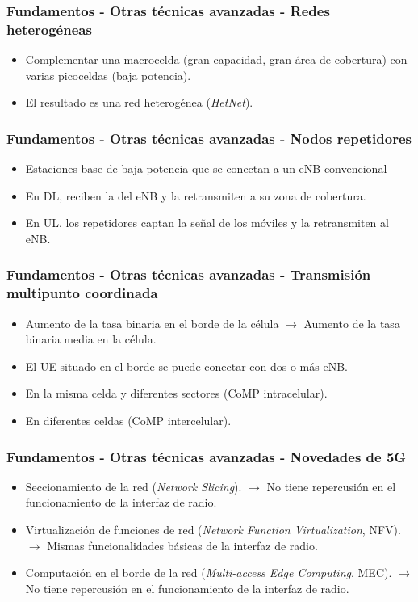\documentclass{beamer}
\begin{document}
\begin{frame}
\frametitle{Fundamentos - Otras técnicas avanzadas - Redes heterogéneas}

\begin{itemize}
\item Complementar una macrocelda (gran capacidad, gran área de cobertura) con varias picoceldas (baja potencia).
\item El resultado es una red heterogénea (\textit{HetNet}).
\end{itemize}
\end{frame}

\begin{frame}
\frametitle{Fundamentos - Otras técnicas avanzadas - Nodos repetidores}

\begin{itemize}
\item Estaciones base de baja potencia que se conectan a un eNB convencional
\item En DL, reciben la del eNB y la retransmiten a su zona de cobertura.
\item En UL, los repetidores captan la señal de los móviles y la retransmiten al eNB.
\end{itemize}
\end{frame}

\begin{frame}
\frametitle{Fundamentos - Otras técnicas avanzadas - Transmisión multipunto coordinada}

\begin{itemize}
\item Aumento de la tasa binaria en el borde de la célula $\rightarrow$ Aumento de la tasa binaria media en la célula.
\item El UE situado en el borde se puede conectar con dos o más eNB.
\item En la misma celda y diferentes sectores (CoMP intracelular).
\item En diferentes celdas (CoMP intercelular).
\end{itemize}
\end{frame}

\begin{frame}
\frametitle{Fundamentos - Otras técnicas avanzadas - Novedades de 5G}

\begin{itemize}
\item Seccionamiento de la red (\textit{Network Slicing}). $\rightarrow$ No tiene repercusión en el funcionamiento de la interfaz de radio.
\item Virtualización de funciones de red (\textit{Network Function Virtualization}, NFV). $\rightarrow$ Mismas funcionalidades básicas de la interfaz de radio.
\item Computación en el borde de la red (\textit{Multi-access Edge Computing}, MEC). $\rightarrow$ No tiene repercusión en el funcionamiento de la interfaz de radio.
\end{itemize}
\end{frame}
\end{document}
